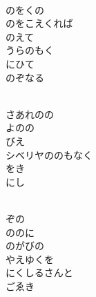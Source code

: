 \documentclass[10pt,b5j]{tarticle} %
\begin{document}
\vspace{1.5em} %
\newcommand{\linespace}{0.5em} %
\newcommand{\blocksize}{0.5\hsize} %
\newcommand{\itemmargin}{3em} %
\begin{enumerate} %
    \setlength{\itemindent}{\itemmargin} %
    \begin{minipage}[c]{\blocksize}
    
        \vspace{\linespace}
        \item~\\
        のをくの\\
        のをこえくれば\\
        のえて\\
        うらのもく\\
        にひて\\
        のぞなる
        
    \end{minipage}
    \begin{minipage}[c]{\blocksize}
        
        \vspace{\linespace}
        \item~\\
        さあれのの\\
        よのの\\
        びえ\\
        シベリヤののもなく\\
        をき\\
        にし
        
    \end{minipage}
    \begin{minipage}[c]{\blocksize}
        
        \vspace{\linespace}
        \item~\\
        ぞの\\
        ののに\\
        のがびの\\
        やえゆくを\\
        にくしるさんと\\
        ごゑき
        

\end{minipage}
\end{enumerate}
\end{document}
